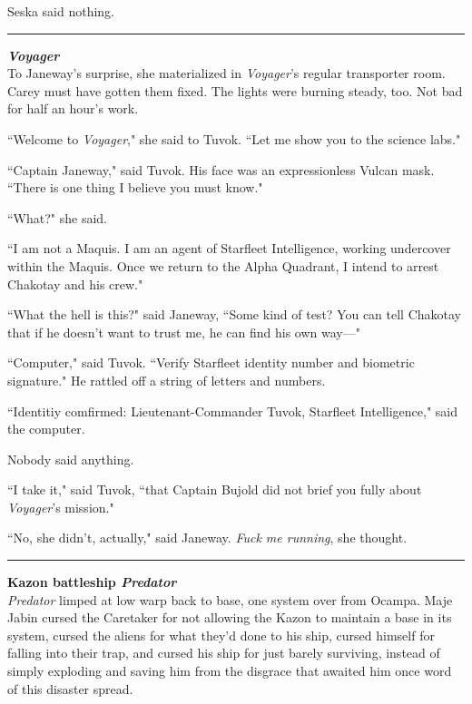 \documentclass[twoside,letterpaper,12pt]{memoir}
\begin{document}
Seska said nothing.

\begin{center}\rule{3cm}{0.4 pt}\end{center}

\noindent\textbf{\textit{Voyager}}\\

To Janeway's surprise, she materialized in \textit{Voyager}'s regular transporter room. Carey must have gotten them fixed. The lights were burning steady, too. Not bad for half an hour's work.

``Welcome to \textit{Voyager}," she said to Tuvok. ``Let me show you to the science labs."

``Captain Janeway," said Tuvok. His face was an expressionless Vulcan mask. ``There is one thing I believe you must know."

``What?" she said.

``I am not a Maquis. I am an agent of Starfleet Intelligence, working undercover within the Maquis. Once we return to the Alpha Quadrant, I intend to arrest Chakotay and his crew."

``What the hell is this?" said Janeway, ``Some kind of test? You can tell Chakotay that if he doesn't want to trust me, he can find his own way---"

``Computer," said Tuvok. ``Verify Starfleet identity number and biometric signature." He rattled off a string of letters and numbers.

``Identitiy comfirmed: Lieutenant-Commander Tuvok, Starfleet Intelligence," said the computer.

Nobody said anything.

``I take it," said Tuvok, ``that Captain Bujold did not brief you fully about \textit{Voyager}'s mission."

``No, she didn't, actually," said Janeway. \textit{Fuck me running}, she thought.

\begin{center}\rule{3cm}{0.4 pt}\end{center}

\noindent\textbf{Kazon battleship \textit{Predator}}\\

\textit{Predator} limped at low warp back to base, one system over from Ocampa. Maje Jabin cursed the Caretaker for not allowing the Kazon to maintain a base in its system, cursed the aliens for what they'd done to his ship, cursed himself for falling into their trap, and cursed his ship for just barely surviving, instead of simply exploding and saving him from the disgrace that awaited him once word of this disaster spread.
\end{document}
